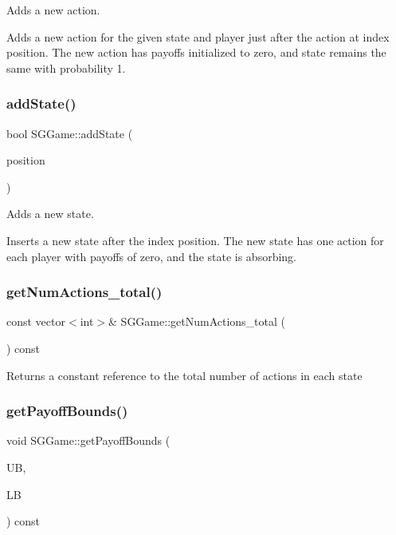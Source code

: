 Adds a new action. 

Adds a new action for the given state and player just after the action at index position. The new action has payoffs initialized to zero, and state remains the same with probability 1. \mbox{\label{classSGGame_a0e4ea56b9e9787dca697782cbedc76d6}} 
\subsubsection{\texorpdfstring{add\+State()}{addState()}}
{\footnotesize\ttfamily bool S\+G\+Game\+::add\+State (\begin{DoxyParamCaption}\item[{int}]{position }\end{DoxyParamCaption})}



Adds a new state. 

Inserts a new state after the index position. The new state has one action for each player with payoffs of zero, and the state is absorbing. \mbox{\label{classSGGame_a22f9effebebb711e2f174c4a95a49420}} 
\subsubsection{\texorpdfstring{get\+Num\+Actions\+\_\+total()}{getNumActions\_total()}}
{\footnotesize\ttfamily const vector$<$int$>$\& S\+G\+Game\+::get\+Num\+Actions\+\_\+total (\begin{DoxyParamCaption}{ }\end{DoxyParamCaption}) const\hspace{0.3cm}{\ttfamily [inline]}}

Returns a constant reference to the total number of actions in each state \mbox{\label{classSGGame_a32293b2ba26d2a8cd264e3b9e7559d22}} 
\subsubsection{\texorpdfstring{get\+Payoff\+Bounds()}{getPayoffBounds()}}
{\footnotesize\ttfamily void S\+G\+Game\+::get\+Payoff\+Bounds (\begin{DoxyParamCaption}\item[{\hyperlink{classSGPoint}{S\+G\+Point} \&}]{UB,  }\item[{\hyperlink{classSGPoint}{S\+G\+Point} \&}]{LB }\end{DoxyParamCaption}) const}

